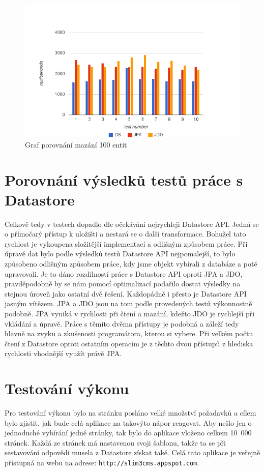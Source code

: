 \begin{figure}[h]
\begin{center}
\includegraphics[width=6.5in]{figures/delete.png}
\caption{Graf porovnání mazání 100 entit}
\label{fig:delete}
\end{center}
\end{figure}

\section{Porovnání výsledků testů práce s Datastore}
Celkově tedy v testech dopadlo dle očekávání nejrychleji Datastore API. Jedná se o přímočarý přístup k uložišti a nestará se o další transformace. Bohužel tato rychlost je vykoupena složitější implementací a odlišným způsobem práce. Při úpravě dat bylo podle výsledků testů Datastore API nejpomalejší, to bylo způsobeno odlišným způsobem práce, kdy jsme objekt vybírali z databáze a poté upravovali. Je to dáno rozdílností práce s Datastore API oproti JPA a JDO, pravděpodobně by se nám pomocí optimalizací podařilo dostat výsledky na stejnou úroveň jako ostatní dvě řešení. Každopádně i přesto je Datastore API jasným vítězem. JPA a JDO jsou na tom podle provedených testů výkonnostně podobně. JPA vyniká v rychlosti při čtení a mazání, kdežto JDO je rychlejší při vkládání a úpravě. Práce s těmito dvěma přístupy je podobná a záleží tedy hlavně na zvyku a zkušenosti programátora, kterou si vybere. Při velkém počtu čtení z Datastore oproti ostatním operacím je z těchto dvou přístupů z hlediska rychlosti vhodnější využít právě JPA.


\section{Testování výkonu}
Pro testování výkonu bylo na stránku posláno velké množství požadavků a cílem bylo zjistit, jak bude celá aplikace na takovýto nápor reagovat. Aby nešlo jen o jednoduché vybírání jedné stránky, tak bylo do aplikace vloženo celkem 10~000 stránek. Každá ze stránek má nastavenou svoji šablonu, takže ta se při sestavování odpovědi musela z Datastore získat také. Celá tato aplikace je veřejně přístupná na webu na adrese: \verb|http://slim3cms.appspot.com|.


